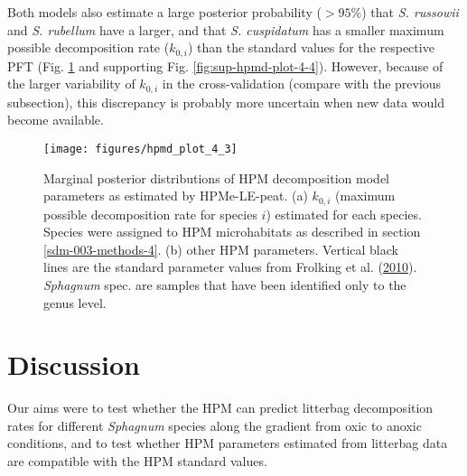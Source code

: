 \documentclass[
  12pt,
]{article}
\begin{document}
Both models also estimate a large posterior probability (\(>95\)\%) that \emph{S. russowii} and \emph{S. rubellum} have a larger, and that \emph{S. cuspidatum} has a smaller maximum possible decomposition rate (\(k_{0,i}\)) than the standard values for the respective PFT (Fig. \ref{fig:out-mm30-hpm-test-p2} and supporting Fig. \ref{fig:sup-hpmd-plot-4-4}). However, because of the larger variability of \(k_{0,i}\) in the cross-validation (compare with the previous subsection), this discrepancy is probably more uncertain when new data would become available.



\begin{figure}[H]

{\centering \texttt{[image: figures/hpmd\_plot\_4\_3]} 

}

\caption{Marginal posterior distributions of HPM decomposition model parameters as estimated by HPMe-LE-peat. (a) \(k_{0,i}\) (maximum possible decomposition rate for species \(i\)) estimated for each species. Species were assigned to HPM microhabitats as described in section \ref{sdm-003-methods-4}. (b) other HPM parameters. Vertical black lines are the standard parameter values from Frolking et al. (\protect\hyperlink{ref-Frolking.2010}{2010}). \emph{Sphagnum} spec. are samples that have been identified only to the genus level.}\label{fig:out-mm30-hpm-test-p2}
\end{figure}

\hypertarget{discussion}{%
\section{Discussion}\label{discussion}}

Our aims were to test whether the HPM can predict litterbag decomposition rates for different \emph{Sphagnum} species along the gradient from oxic to anoxic conditions, and to test whether HPM parameters estimated from litterbag data are compatible with the HPM standard values.
\end{document}
